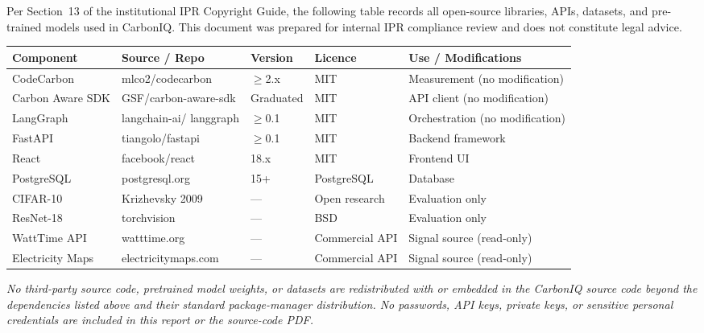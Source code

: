 ﻿\documentclass[conference]{IEEEtran}
\begin{document}
\noindent Per Section~13 of the institutional IPR Copyright Guide, the following
table records all open-source libraries, APIs, datasets, and pre-trained models
used in CarbonIQ.
This document was prepared for internal IPR compliance review and does not constitute
legal advice.

\vspace{6pt}
\noindent\begin{tabular}{@{}p{2.0cm}p{2.0cm}p{1.5cm}p{1.8cm}p{2.4cm}@{}}
\toprule
\textbf{Component} & \textbf{Source / Repo} & \textbf{Version} & \textbf{Licence} & \textbf{Use / Modifications}\\
\midrule
CodeCarbon & mlco2/codecarbon & $\geq$2.x & MIT & Measurement (no modification)\\
Carbon Aware SDK & GSF/carbon-aware-sdk & Graduated & MIT & API client (no modification)\\
LangGraph & langchain-ai/ langgraph & $\geq$0.1 & MIT & Orchestration (no modification)\\
FastAPI & tiangolo/fastapi & $\geq$0.1 & MIT & Backend framework\\
React & facebook/react & 18.x & MIT & Frontend UI\\
PostgreSQL & postgresql.org & 15+ & PostgreSQL & Database\\
CIFAR-10 & Krizhevsky 2009 & --- & Open research & Evaluation only\\
ResNet-18 & torchvision & --- & BSD & Evaluation only\\
WattTime API & watttime.org & --- & Commercial API & Signal source (read-only)\\
Electricity Maps & electricitymaps.com & --- & Commercial API & Signal source (read-only)\\
\bottomrule
\end{tabular}

\vspace{6pt}
\noindent\textit{No third-party source code, pretrained model weights, or datasets
are redistributed with or embedded in the CarbonIQ source code beyond the
dependencies listed above and their standard package-manager distribution.
No passwords, API keys, private keys, or sensitive personal credentials are
included in this report or the source-code PDF.}
\end{document}
